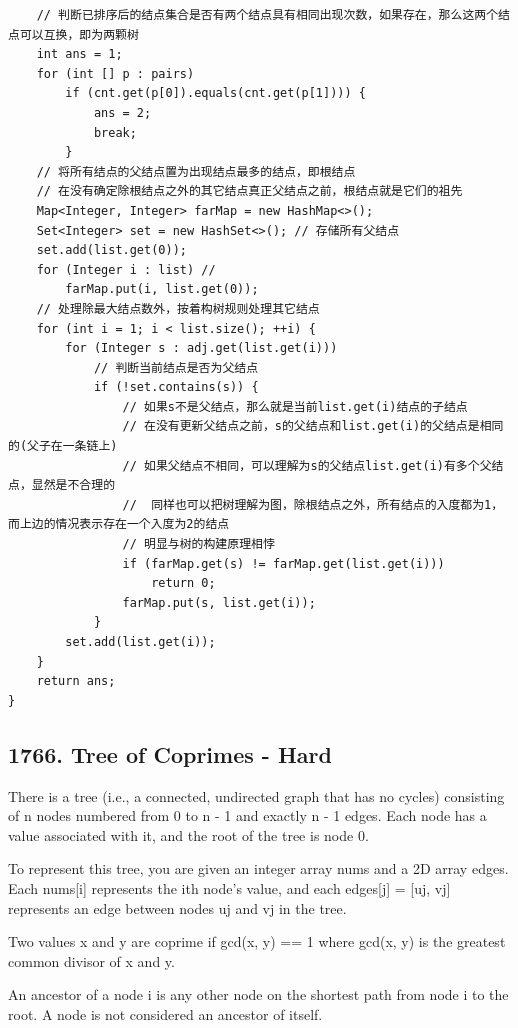 \documentclass[9pt, b5paaper]{book}
\begin{document}
\begin{enumerate}
\begin{verbatim}
    // 判断已排序后的结点集合是否有两个结点具有相同出现次数，如果存在，那么这两个结点可以互换，即为两颗树
    int ans = 1;
    for (int [] p : pairs) 
        if (cnt.get(p[0]).equals(cnt.get(p[1]))) {
            ans = 2;
            break;
        }
    // 将所有结点的父结点置为出现结点最多的结点，即根结点
    // 在没有确定除根结点之外的其它结点真正父结点之前，根结点就是它们的祖先
    Map<Integer, Integer> farMap = new HashMap<>();
    Set<Integer> set = new HashSet<>(); // 存储所有父结点
    set.add(list.get(0));
    for (Integer i : list) // 
        farMap.put(i, list.get(0));
    // 处理除最大结点数外，按着构树规则处理其它结点
    for (int i = 1; i < list.size(); ++i) {
        for (Integer s : adj.get(list.get(i))) 
            // 判断当前结点是否为父结点
            if (!set.contains(s)) {
                // 如果s不是父结点，那么就是当前list.get(i)结点的子结点
                // 在没有更新父结点之前，s的父结点和list.get(i)的父结点是相同的(父子在一条链上)
                // 如果父结点不相同，可以理解为s的父结点list.get(i)有多个父结点，显然是不合理的
                //  同样也可以把树理解为图，除根结点之外，所有结点的入度都为1，而上边的情况表示存在一个入度为2的结点
                // 明显与树的构建原理相悖
                if (farMap.get(s) != farMap.get(list.get(i)))
                    return 0;
                farMap.put(s, list.get(i));
            }
        set.add(list.get(i));
    }
    return ans;
}
\end{verbatim}
\end{enumerate}
\subsection{1766. Tree of Coprimes - Hard}
\label{sec-3-0-3}
There is a tree (i.e., a connected, undirected graph that has no cycles) consisting of n nodes numbered from 0 to n - 1 and exactly n - 1 edges. Each node has a value associated with it, and the root of the tree is node 0.

To represent this tree, you are given an integer array nums and a 2D array edges. Each nums[i] represents the ith node's value, and each edges[j] = [uj, vj] represents an edge between nodes uj and vj in the tree.

Two values x and y are coprime if gcd(x, y) == 1 where gcd(x, y) is the greatest common divisor of x and y.

An ancestor of a node i is any other node on the shortest path from node i to the root. A node is not considered an ancestor of itself.
\end{document}
